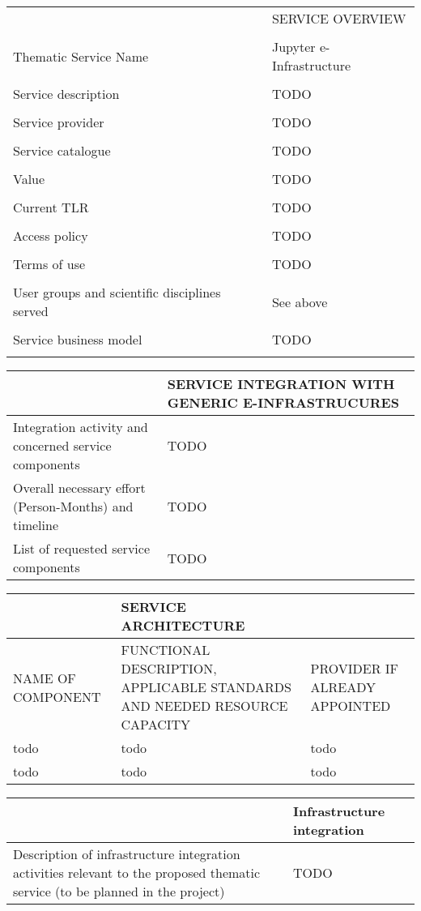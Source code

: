 \begin{tabular}{|l|l|}
\hline
 & SERVICE OVERVIEW\\
\\\hline
Thematic Service Name&Jupyter e-Infrastructure\\
\\\hline
Service description&TODO\\
\\\hline
Service provider&TODO\\
\\\hline
Service catalogue&TODO\\
\\\hline
Value&TODO\\
\\\hline
Current TLR&TODO\\
\\\hline
Access policy&TODO\\
\\\hline
Terms of use&TODO\\
\\\hline
User groups and scientific disciplines served&See above\\
\\\hline
Service business model&TODO\\
\\\hline
\end{tabular}


\begin{tabular}{|l|l|}
&SERVICE INTEGRATION WITH GENERIC E-INFRASTRUCURES
\\\hline
Integration activity and concerned service components&TODO
\\\hline
Overall necessary effort (Person-Months) and timeline&TODO
\\\hline
List of requested service components&TODO
\\\hline
\end{tabular}

\begin{tabular}{|p{7cm}|l|l|}
&SERVICE ARCHITECTURE&
\\\hline
NAME OF COMPONENT&FUNCTIONAL DESCRIPTION, APPLICABLE STANDARDS AND NEEDED RESOURCE CAPACITY&PROVIDER IF ALREADY APPOINTED
\\\hline
todo&todo&todo
\\\hline
todo&todo&todo
\\\hline
\end{tabular}

\begin{tabular}{|p{7cm}|l|}
&Infrastructure integration
\\\hline
Description of infrastructure integration activities relevant to the proposed thematic service (to be planned in the project)&TODO
\\\hline
\end{tabular}

